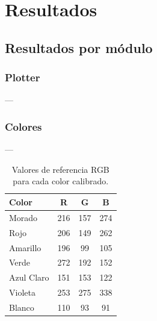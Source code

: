 \section{Resultados}

\subsection{Resultados por módulo}

\subsubsection{\textbf{Plotter}}---





\subsubsection{\textbf{Colores}}---

\begin{table}[H]
\centering
\caption{Valores de referencia RGB para cada color calibrado.}
\begin{tabular}{lccc}
\toprule
\textbf{Color} & \textbf{R} & \textbf{G} & \textbf{B} \\
\midrule
Morado      & 216 & 157 & 274 \\
Rojo        & 206 & 149 & 262 \\
Amarillo    & 196 &  99 & 105 \\
Verde       & 272 & 192 & 152 \\
Azul Claro  & 151 & 153 & 122 \\
Violeta     & 253 & 275 & 338 \\
Blanco      & 110 &  93 &  91 \\
\bottomrule
\end{tabular}
\label{tab:color_ref}
\end{table}

